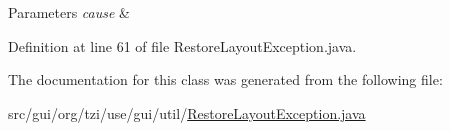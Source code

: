 \begin{DoxyParams}{Parameters}
{\em cause} & \\
\hline
\end{DoxyParams}


Definition at line 61 of file Restore\-Layout\-Exception.\-java.



The documentation for this class was generated from the following file\-:\begin{DoxyCompactItemize}
\item 
src/gui/org/tzi/use/gui/util/\hyperlink{_restore_layout_exception_8java}{Restore\-Layout\-Exception.\-java}\end{DoxyCompactItemize}
